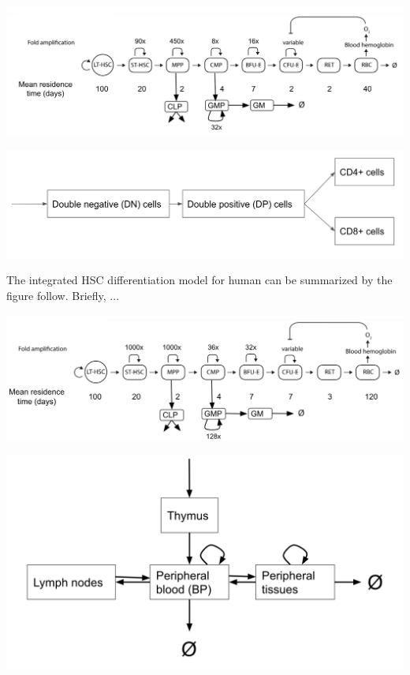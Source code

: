 \documentclass[a0paper,portrait]{baposter}
\begin{document}
\begin{poster}
{\begin{minipage}[b]{0.55\linewidth}
\centering
\includegraphics[width=\textwidth]{../img/mouse_full_model.png}
\end{minipage}
\hspace{0.5cm}
\begin{minipage}[b]{0.4\linewidth}
\centering
\includegraphics[width=\textwidth]{../img/Diagram_thomas2008.png}
\end{minipage}



The integrated HSC differentiation model for human can be summarized by the figure follow. Briefly, ...


\begin{minipage}[b]{0.55\linewidth}
\centering
\includegraphics[width=\textwidth]{../img/human_full_structure.png}
\end{minipage}
\hspace{0.5cm}
\begin{minipage}[b]{0.4\linewidth}
\centering
\includegraphics[width=\textwidth]{../img/human_naiveT.png}
\end{minipage}


}
\end{poster}
\end{document}

